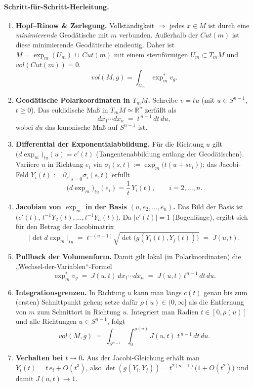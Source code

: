 \documentclass[10pt, letterpaper]{article}
\begin{document}
\paragraph*{Schritt-für-Schritt-Herleitung.}
\begin{enumerate}
  \item \textbf{Hopf–Rinow \& Zerlegung.}
  Vollständigkeit $\Rightarrow$ jedes $x\in M$ ist durch eine \emph{minimierende} Geodätische mit $m$ verbunden. Außerhalb der $Cut(m)$ ist diese minimierende Geodätische eindeutig.
  Daher ist $M=\exp_m(U_m)\,\cup\,Cut(m)$ mit einem sternförmigen $U_m\subset T_mM$ und $vol(Cut(m))=0$.
  \[
    vol(M,g)=\int_{U_m}\exp_m^*v_g.
  \]

  \item \textbf{Geodätische Polarkoordinaten in $T_mM$.}
  Schreibe $v=tu$ (mit $u\in S^{n-1}$, $t\ge 0$). Das euklidische Maß in $T_mM\simeq\mathbb{R}^n$ zerfällt als
  \[
     dx_1\cdots dx_n \;=\; t^{\,n-1}\,dt\,du,
  \]
  wobei $du$ das kanonische Maß auf $S^{n-1}$ ist.

  \item \textbf{Differential der Exponentialabbildung.}
  Für die Richtung $u$ gilt $\big(d\exp_m\big)_{tu}(u)=c'(t)$ (Tangentenabbildung entlang der Geodätischen).
  Variiere $u$ in Richtung $e_i$ via $\sigma_i(s,t):=\exp_m\big(t(u+se_i)\big)$;
  das Jacobi-Feld $Y_i(t):=\partial_s|_{s=0}\sigma_i(s,t)$ erfüllt
  \[
     \big(d\exp_m\big)_{tu}(e_i)=\frac{1}{t}\,Y_i(t),\qquad i=2,\dots,n.
  \]

  \item \textbf{Jacobian von $\exp_m$ in der Basis $(u,e_2,\dots,e_n)$.}
  Das Bild der Basis ist $\big(c'(t),\,t^{-1}Y_2(t),\dots,t^{-1}Y_n(t)\big)$.
  Da $|c'(t)|=1$ (Bogenlänge), ergibt sich für den Betrag der Jacobimatrix
  \[
     \big|\det d\exp_m\big|_{tu}
     \;=\;t^{-(n-1)}\sqrt{\det\big(g(Y_i(t),Y_j(t))\big)} \;=\; J(u,t).
  \]

  \item \textbf{Pullback der Volumenform.}
  Damit gilt lokal (in Polarkoordinaten) die „Wechsel-der-Variablen“-Formel
  \[
     \exp_m^*v_g \;=\; J(u,t)\,dx_1\cdots dx_n \;=\; J(u,t)\,t^{n-1}\,dt\,du.
  \]

  \item \textbf{Integrationsgrenzen.}
  In Richtung $u$ kann man längs $c(t)$ genau bis zum (ersten) Schnittpunkt gehen; setze dafür
  $\rho(u)\in(0,\infty]$ als die Entfernung von $m$ zum Schnittort in Richtung $u$.
  Integriert man Radien $t\in[0,\rho(u)]$ und alle Richtungen $u\in S^{n-1}$, folgt
  \[
     vol(M,g)\;=\;\int_{S^{n-1}}\!\int_{0}^{\rho(u)} J(u,t)\;t^{\,n-1}\,dt\,du.
  \]

  \item \textbf{Verhalten bei $t\to 0$.}
  Aus der Jacobi-Gleichung erhält man $Y_i(t)=t\,e_i+O(t^3)$, also
  $\det(g(Y_i,Y_j))=t^{2(n-1)}\big(1+O(t^2)\big)$ und damit $J(u,t)\to 1$.
\end{enumerate}
\end{document}
